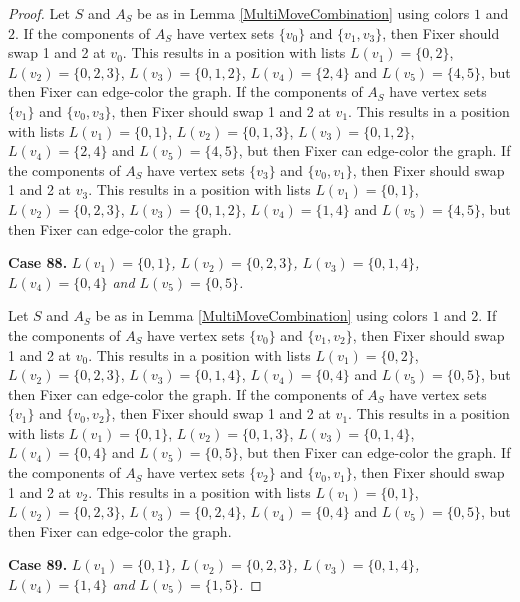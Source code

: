 \documentclass[12pt]{amsart}
\theoremstyle{plain}
\theoremstyle{definition}
\theoremstyle{remark}
\begin{document}
\begin{proof}
Let $S$ and $A_S$ be as in Lemma \ref{MultiMoveCombination} using colors $1$ and $2$. If the components of $A_S$ have vertex sets $\{v_0\}$ and $\{v_1, v_3\}$, then Fixer should swap 1 and 2 at $v_0$. This results in a position with lists $L(v_1) = \{0, 2\}$, $L(v_2) = \{0, 2, 3\}$, $L(v_3) = \{0, 1, 2\}$, $L(v_4) = \{2, 4\}$ and $L(v_5) = \{4, 5\}$, but then Fixer can edge-color the graph.
If the components of $A_S$ have vertex sets $\{v_1\}$ and $\{v_0, v_3\}$, then Fixer should swap 1 and 2 at $v_1$. This results in a position with lists $L(v_1) = \{0, 1\}$, $L(v_2) = \{0, 1, 3\}$, $L(v_3) = \{0, 1, 2\}$, $L(v_4) = \{2, 4\}$ and $L(v_5) = \{4, 5\}$, but then Fixer can edge-color the graph.
If the components of $A_S$ have vertex sets $\{v_3\}$ and $\{v_0, v_1\}$, then Fixer should swap 1 and 2 at $v_3$. This results in a position with lists $L(v_1) = \{0, 1\}$, $L(v_2) = \{0, 2, 3\}$, $L(v_3) = \{0, 1, 2\}$, $L(v_4) = \{1, 4\}$ and $L(v_5) = \{4, 5\}$, but then Fixer can edge-color the graph.

\noindent\textbf{Case 88.  }\textit{$L(v_1) = \{0, 1\}$, $L(v_2) = \{0, 2, 3\}$, $L(v_3) = \{0, 1, 4\}$, $L(v_4) = \{0, 4\}$ and $L(v_5) = \{0, 5\}$.}

Let $S$ and $A_S$ be as in Lemma \ref{MultiMoveCombination} using colors $1$ and $2$. If the components of $A_S$ have vertex sets $\{v_0\}$ and $\{v_1, v_2\}$, then Fixer should swap 1 and 2 at $v_0$. This results in a position with lists $L(v_1) = \{0, 2\}$, $L(v_2) = \{0, 2, 3\}$, $L(v_3) = \{0, 1, 4\}$, $L(v_4) = \{0, 4\}$ and $L(v_5) = \{0, 5\}$, but then Fixer can edge-color the graph.
If the components of $A_S$ have vertex sets $\{v_1\}$ and $\{v_0, v_2\}$, then Fixer should swap 1 and 2 at $v_1$. This results in a position with lists $L(v_1) = \{0, 1\}$, $L(v_2) = \{0, 1, 3\}$, $L(v_3) = \{0, 1, 4\}$, $L(v_4) = \{0, 4\}$ and $L(v_5) = \{0, 5\}$, but then Fixer can edge-color the graph.
If the components of $A_S$ have vertex sets $\{v_2\}$ and $\{v_0, v_1\}$, then Fixer should swap 1 and 2 at $v_2$. This results in a position with lists $L(v_1) = \{0, 1\}$, $L(v_2) = \{0, 2, 3\}$, $L(v_3) = \{0, 2, 4\}$, $L(v_4) = \{0, 4\}$ and $L(v_5) = \{0, 5\}$, but then Fixer can edge-color the graph.

\noindent\textbf{Case 89.  }\textit{$L(v_1) = \{0, 1\}$, $L(v_2) = \{0, 2, 3\}$, $L(v_3) = \{0, 1, 4\}$, $L(v_4) = \{1, 4\}$ and $L(v_5) = \{1, 5\}$.}


\end{proof}
\end{document}
